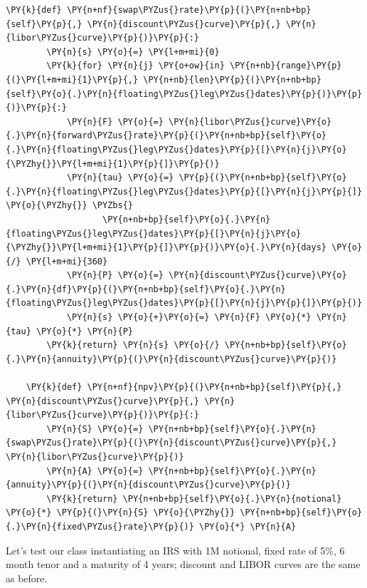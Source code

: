 \begin{tcolorbox}[breakable, size=fbox, boxrule=1pt, pad at break*=1mm,colback=cellbackground, colframe=cellborder]
\begin{Verbatim}[commandchars=\\\{\}]
    \PY{k}{def} \PY{n+nf}{swap\PYZus{}rate}\PY{p}{(}\PY{n+nb+bp}{self}\PY{p}{,} \PY{n}{discount\PYZus{}curve}\PY{p}{,} \PY{n}{libor\PYZus{}curve}\PY{p}{)}\PY{p}{:}
        \PY{n}{s} \PY{o}{=} \PY{l+m+mi}{0}
        \PY{k}{for} \PY{n}{j} \PY{o+ow}{in} \PY{n+nb}{range}\PY{p}{(}\PY{l+m+mi}{1}\PY{p}{,} \PY{n+nb}{len}\PY{p}{(}\PY{n+nb+bp}{self}\PY{o}{.}\PY{n}{floating\PYZus{}leg\PYZus{}dates}\PY{p}{)}\PY{p}{)}\PY{p}{:}
            \PY{n}{F} \PY{o}{=} \PY{n}{libor\PYZus{}curve}\PY{o}{.}\PY{n}{forward\PYZus{}rate}\PY{p}{(}\PY{n+nb+bp}{self}\PY{o}{.}\PY{n}{floating\PYZus{}leg\PYZus{}dates}\PY{p}{[}\PY{n}{j}\PY{o}{\PYZhy{}}\PY{l+m+mi}{1}\PY{p}{]}\PY{p}{)}
            \PY{n}{tau} \PY{o}{=} \PY{p}{(}\PY{n+nb+bp}{self}\PY{o}{.}\PY{n}{floating\PYZus{}leg\PYZus{}dates}\PY{p}{[}\PY{n}{j}\PY{p}{]} \PY{o}{\PYZhy{}} \PYZbs{}
                   \PY{n+nb+bp}{self}\PY{o}{.}\PY{n}{floating\PYZus{}leg\PYZus{}dates}\PY{p}{[}\PY{n}{j}\PY{o}{\PYZhy{}}\PY{l+m+mi}{1}\PY{p}{]}\PY{p}{)}\PY{o}{.}\PY{n}{days} \PY{o}{/} \PY{l+m+mi}{360}
            \PY{n}{P} \PY{o}{=} \PY{n}{discount\PYZus{}curve}\PY{o}{.}\PY{n}{df}\PY{p}{(}\PY{n+nb+bp}{self}\PY{o}{.}\PY{n}{floating\PYZus{}leg\PYZus{}dates}\PY{p}{[}\PY{n}{j}\PY{p}{]}\PY{p}{)}
            \PY{n}{s} \PY{o}{+}\PY{o}{=} \PY{n}{F} \PY{o}{*} \PY{n}{tau} \PY{o}{*} \PY{n}{P}
        \PY{k}{return} \PY{n}{s} \PY{o}{/} \PY{n+nb+bp}{self}\PY{o}{.}\PY{n}{annuity}\PY{p}{(}\PY{n}{discount\PYZus{}curve}\PY{p}{)}
        
    \PY{k}{def} \PY{n+nf}{npv}\PY{p}{(}\PY{n+nb+bp}{self}\PY{p}{,} \PY{n}{discount\PYZus{}curve}\PY{p}{,} \PY{n}{libor\PYZus{}curve}\PY{p}{)}\PY{p}{:}
        \PY{n}{S} \PY{o}{=} \PY{n+nb+bp}{self}\PY{o}{.}\PY{n}{swap\PYZus{}rate}\PY{p}{(}\PY{n}{discount\PYZus{}curve}\PY{p}{,} \PY{n}{libor\PYZus{}curve}\PY{p}{)}
        \PY{n}{A} \PY{o}{=} \PY{n+nb+bp}{self}\PY{o}{.}\PY{n}{annuity}\PY{p}{(}\PY{n}{discount\PYZus{}curve}\PY{p}{)}
        \PY{k}{return} \PY{n+nb+bp}{self}\PY{o}{.}\PY{n}{notional} \PY{o}{*} \PY{p}{(}\PY{n}{S} \PY{o}{\PYZhy{}} \PY{n+nb+bp}{self}\PY{o}{.}\PY{n}{fixed\PYZus{}rate}\PY{p}{)} \PY{o}{*} \PY{n}{A}
\end{Verbatim}
\end{tcolorbox}

Let's test our class instantiating an IRS with 1M notional, fixed rate
of 5\%, 6 month tenor and a maturity of 4 years; discount and LIBOR
curves are the same as before.

